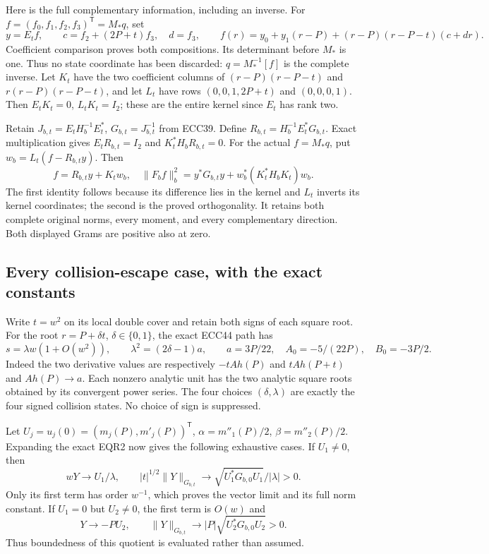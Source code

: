\documentclass[11pt]{article}
\begin{document}
Here is the full complementary information, including an inverse.
For $f=(f_0,f_1,f_2,f_3)^{\mathsf T}=M_*q$, set
\[
 y=E_tf,\qquad c=f_2+(2P+t)f_3,\quad d=f_3,\qquad
 f(r)=y_0+y_1(r-P)+(r-P)(r-P-t)(c+dr).
 \tag{EQR3}
\]
Coefficient comparison proves both compositions. Its determinant
before $M_*$ is one. Thus no state coordinate has been discarded:
$q=M_*^{-1}[f]$ is the complete inverse. Let $K_t$ have the two
coefficient columns of $(r-P)(r-P-t)$ and $r(r-P)(r-P-t)$,
and let $L_t$ have rows $(0,0,1,2P+t)$ and $(0,0,0,1)$.
Then $E_tK_t=0$, $L_tK_t=I_2$; these are the entire kernel since
$E_t$ has rank two.

Retain $J_{b,t}=E_tH_b^{-1}E_t^*$, $G_{b,t}=J_{b,t}^{-1}$ from
ECC39. Define $R_{b,t}=H_b^{-1}E_t^*G_{b,t}$. Exact multiplication
gives $E_tR_{b,t}=I_2$ and $K_t^*H_bR_{b,t}=0$. For the actual
$f=M_*q$, put $w_b=L_t(f-R_{b,t}y)$. Then
\[
 f=R_{b,t}y+K_tw_b,\quad
 \|F_bf\|_b^2=y^*G_{b,t}y+w_b^*(K_t^*H_bK_t)w_b.
 \tag{EQR4}
\]
The first identity follows because its difference lies in the kernel
and $L_t$ inverts its kernel coordinates; the second is the proved
orthogonality. It retains both complete original norms, every moment,
and every complementary direction. Both displayed Grams are positive
also at zero.

\subsection{Every collision-escape case, with the exact constants}
Write $t=w^2$ on its local double cover and retain both signs of each
square root. For the root $r=P+\delta t$, $\delta\in\{0,1\}$,
the exact ECC44 path has
\[
 s=\lambda w(1+O(w^2)),\qquad
 \lambda^2=(2\delta-1)a,\qquad a=3P/22,
 \quad A_0=-5/(22P),\quad B_0=-3P/2.
 \tag{EQR5}
\]
Indeed the two derivative values are respectively $-tA h(P)$ and
$tA h(P+t)$ and $Ah(P)\to a$. Each nonzero analytic unit has the
two analytic square roots obtained by its convergent power series.
The four choices $(\delta,\lambda)$ are exactly the four signed
collision states. No choice of sign is suppressed.

Let $U_j=u_j(0)=(m_j(P),m'_j(P))^{\mathsf T}$,
$\alpha=m''_1(P)/2$, $\beta=m''_2(P)/2$.
Expanding the exact EQR2 now gives the following exhaustive cases.
If $U_1\ne0$, then
\[
 wY\longrightarrow U_1/\lambda,\qquad
 |t|^{1/2}\|Y\|_{G_{b,t}}
   \longrightarrow \sqrt{U_1^*G_{b,0}U_1}/|\lambda|>0.
 \tag{EQR6}
\]
Only its first term has order $w^{-1}$, which proves the vector
limit and its full norm constant. If $U_1=0$ but $U_2\ne0$, the
first term is $O(w)$ and
\[
 Y\longrightarrow-PU_2,\qquad
 \|Y\|_{G_{b,t}}\longrightarrow |P|\sqrt{U_2^*G_{b,0}U_2}>0.
 \tag{EQR7}
\]
Thus boundedness of this quotient is evaluated rather than assumed.
\end{document}
